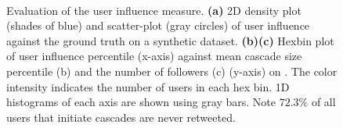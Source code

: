 
\begin{figure}[tb]
	\centering
	\newcommand\myheight{0.171}
	\\
	\caption{ 
		Evaluation of the user influence measure.
		\textbf{(a)} 2D density plot (shades of blue) and scatter-plot (gray circles) of user influence against the ground truth on a synthetic dataset.
		\textbf{(b)(c)} Hexbin plot of user influence percentile (x-axis) against mean cascade size percentile (b) and the number of followers (c) (y-axis) on \debate.
		The color intensity indicates the number of users in each hex bin.
		1D histograms of each axis are shown using gray bars.
		Note $72.3\%$ of all users that initiate cascades are never retweeted.
	}
\end{figure}